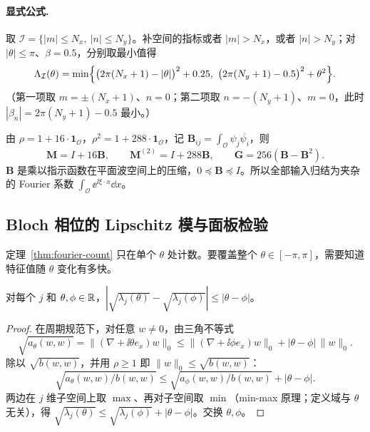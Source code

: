 \documentclass[11pt,a4paper,fontset=fandol]{ctexart}
\begin{document}
\paragraph{显式公式.} 取 $\mathcal I=\{|m|\le N_x,\ |n|\le N_y\}$。补空间的指标或者 $|m|>N_x$，或者 $|n|>N_y$；对 $|\theta|\le\pi$、$\beta=0.5$，分别取最小值得
\begin{equation}
\label{eq:Lambda-I}
\Lambda_{\mathcal I}(\theta)=\min\Bigl\{\bigl(2\pi(N_x+1)-|\theta|\bigr)^2+0.25,\ \bigl(2\pi(N_y+1)-0.5\bigr)^2+\theta^2\Bigr\}.
\end{equation}
（第一项取 $m=\pm(N_x+1)$、$n=0$；第二项取 $n=-(N_y+1)$、$m=0$，此时 $|\beta_n|=2\pi(N_y+1)-0.5$ 最小。）

由 $\rho=1+16\cdot\mathbf 1_{\mathcal O}$，$\rho^2=1+288\cdot\mathbf 1_{\mathcal O}$，记 $\bm B_{ij}=\int_{\mathcal O}\psi_j\overline{\psi_i}$，则
\begin{equation}
\label{eq:MBG}
\bm M=I+16\bm B,\qquad \bm M^{(2)}=I+288\bm B,\qquad \bm G=256(\bm B-\bm B^2).
\end{equation}
$\bm B$ 是乘以指示函数在平面波空间上的压缩，$0\preceq\bm B\preceq I$。所以全部输入归结为夹杂的 Fourier 系数 $\int_{\mathcal O}\ee^{\ii\xi\cdot x}\dd x$。

\subsection{Bloch 相位的 Lipschitz 模与面板检验}

定理~\ref{thm:fourier-count} 只在单个 $\theta$ 处计数。要覆盖整个 $\theta\in[-\pi,\pi]$，需要知道特征值随 $\theta$ 变化有多快。

\begin{lemma}[Lipschitz 模]
\label{lem:lipschitz}
对每个 $j$ 和 $\theta,\phi\in\mathbb R$，$|\sqrt{\lambda_j(\theta)}-\sqrt{\lambda_j(\phi)}|\le|\theta-\phi|$。
\end{lemma}

\begin{proof}
在周期规范下，对任意 $w\ne0$，由三角不等式
\[
\sqrt{a_\theta(w,w)}=\|(\nabla+\ii\theta e_x)w\|_0\le\|(\nabla+\ii\phi e_x)w\|_0+|\theta-\phi|\,\|w\|_0 .
\]
除以 $\sqrt{b(w,w)}$，并用 $\rho\ge1$ 即 $\|w\|_0\le\sqrt{b(w,w)}$：
\[
\sqrt{a_\theta(w,w)/b(w,w)}\le\sqrt{a_\phi(w,w)/b(w,w)}+|\theta-\phi| .
\]
两边在 $j$ 维子空间上取 $\max$、再对子空间取 $\min$（min-max 原理；定义域与 $\theta$ 无关），得 $\sqrt{\lambda_j(\theta)}\le\sqrt{\lambda_j(\phi)}+|\theta-\phi|$。交换 $\theta,\phi$。
\end{proof}
\end{document}
